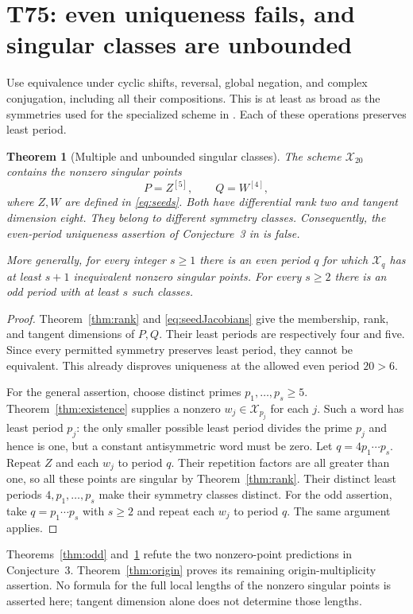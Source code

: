 \documentclass[11pt,a4paper]{article}
\newtheorem{theorem}{Theorem}
\theoremstyle{definition}
\theoremstyle{remark}
\newcommand{\X}{\mathcal X}
\begin{document}
\section{T75: even uniqueness fails, and singular classes are unbounded}

Use equivalence under cyclic shifts, reversal, global negation, and complex
conjugation, including all their compositions. This is at least as broad as
the symmetries used for the specialized scheme in \cite{FFORS}. Each of
these operations preserves least period.

\begin{theorem}[Multiple and unbounded singular classes]\label{thm:many}
The scheme $\X_{20}$ contains the nonzero singular points
\[
 P=Z^{[5]},\qquad Q=W^{[4]},
\]
where $Z,W$ are defined in \eqref{eq:seeds}. Both have differential rank
two and tangent dimension eight. They belong to different symmetry classes.
Consequently, the even-period uniqueness assertion of Conjecture~3 in
\cite{FFORS} is false.

More generally, for every integer $s\geq1$ there is an even period $q$
for which $\X_q$ has at least $s+1$ inequivalent nonzero singular points.
For every $s\geq2$ there is an odd period with at least $s$ such classes.
\end{theorem}
\begin{proof}
Theorem~\ref{thm:rank} and \eqref{eq:seedJacobians} give the membership,
rank, and tangent dimensions of $P,Q$. Their least periods are respectively
four and five. Since every permitted symmetry preserves least period, they
cannot be equivalent. This already disproves uniqueness at the allowed
even period $20>6$.

For the general assertion, choose distinct primes $p_1,\ldots,p_s\geq5$.
Theorem~\ref{thm:existence} supplies a nonzero $w_j\in\X_{p_j}$ for each
$j$. Such a word has least period $p_j$: the only smaller possible least
period divides the prime $p_j$ and hence is one, but a constant
antisymmetric word must be zero.
Let $q=4p_1\cdots p_s$. Repeat $Z$ and each $w_j$ to period $q$.
Their repetition factors are all greater than one, so all these points
are singular by Theorem~\ref{thm:rank}. Their distinct least periods
$4,p_1,\ldots,p_s$ make their symmetry classes distinct.
For the odd assertion, take $q=p_1\cdots p_s$ with $s\geq2$ and repeat
each $w_j$ to period $q$. The same argument applies.
\end{proof}

Theorems~\ref{thm:odd} and~\ref{thm:many} refute the two nonzero-point
predictions in Conjecture~3. Theorem~\ref{thm:origin} proves its remaining
origin-multiplicity assertion. No formula for the full local lengths of the
nonzero singular points is asserted here; tangent dimension alone does not
determine those lengths.
\end{document}
